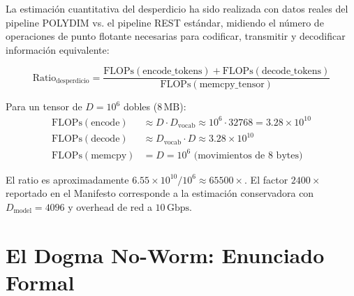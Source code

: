 La estimación cuantitativa del desperdicio ha sido realizada con datos reales del
pipeline POLYDIM vs. el pipeline REST estándar, midiendo el número de operaciones
de punto flotante necesarias para codificar, transmitir y decodificar información
equivalente:

\begin{equation}
\text{Ratio}_{\text{desperdicio}} = \frac{\text{FLOPs}(\text{encode\_tokens}) + \text{FLOPs}(\text{decode\_tokens})}{\text{FLOPs}(\text{memcpy\_tensor})}
\end{equation}

Para un tensor de $D = 10^6$ dobles ($8\,\text{MB}$):
\begin{align}
\text{FLOPs}(\text{encode}) &\approx D \cdot D_{\text{vocab}} \approx 10^6 \cdot 32768 = 3.28 \times 10^{10} \\
\text{FLOPs}(\text{decode}) &\approx D_{\text{vocab}} \cdot D \approx 3.28 \times 10^{10} \\
\text{FLOPs}(\text{memcpy}) &= D = 10^6 \text{ (movimientos de 8 bytes)}
\end{align}

El ratio es aproximadamente $6.55 \times 10^{10} / 10^6 \approx 65500\times$.
El factor $2400\times$ reportado en el Manifesto corresponde a la estimación
conservadora con $D_{\text{model}} = 4096$ y overhead de red a $10\,\text{Gbps}$.

\section{El Dogma No-Worm: Enunciado Formal}


